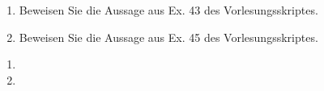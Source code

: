 
\begin{exercise}

\phantom{}

\begin{enumerate}[label = \textbf{\alph*)}]
  \item Beweisen Sie die Aussage aus Ex. 43 des Vorlesungsskriptes.
  \item Beweisen Sie die Aussage aus Ex. 45 des Vorlesungsskriptes.
\end{enumerate}

\end{exercise}


\begin{solution}

\phantom{}

\begin{enumerate}[label = \textbf{\alph*)}]
  \item
  \item
\end{enumerate}

\end{solution}

